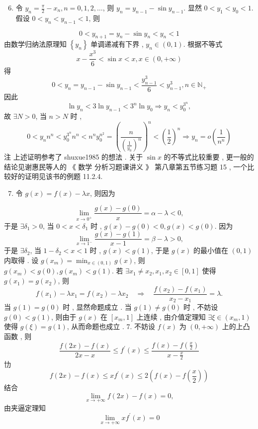 \documentclass[10pt]{article}
\begin{document}
\begin{enumerate}
  \setcounter{enumi}{5}
  \item  令  $y_{n}=\frac{\pi}{2}-x_{n}, n=0,1,2, \ldots$,  则  $y_{n}=y_{n-1}-\sin y_{n-1}$.  显然  $0<y_{1}<y_{0}<1$.  假设  $0<y_{n}<y_{n-1}<1$,  则 
\end{enumerate}
$$
0<y_{n+1}=y_{n}-\sin y_{n}<y_{n}<1
$$
 由数学归纳法原理知  $\left\{y_{n}\right\}$  单调递减有下界 , $y_{n} \in(0,1)$.  根据不等式 
$$
x-\frac{x^{3}}{6}<\sin x<x, x \in(0,+\infty)
$$
 得 
$$
0<y_{n}=y_{n-1}-\sin y_{n-1}<\frac{y_{n-1}^{3}}{6}<y_{n-1}^{3}, n \in \mathbb{N}_{+}
$$
 因此 
$$
\ln y_{n}<3 \ln y_{n-1}<3^{n} \ln y_{0} \Longrightarrow y_{n}<y_{0}^{3^{n}},
$$
 故  $\exists N>0$,  当  $n>N$  时 ,
$$
0<y_{n} n^{n}<y_{0}^{3^{n}} n^{n}<n^{n} y_{0}^{n^{2}}=\left(\frac{n}{\left(\frac{1}{y_{0}}\right)^{n}}\right)^{n}<\left(\frac{1}{2}\right)^{n} \Longrightarrow y_{n}=o\left(\frac{1}{n^{n}}\right)
$$
 注   上述证明参考了  shuxue1985  的想法 .  关于  $\sin x$  的不等式比较重要 ,  更一般的结论见谢惠民等人的 《 数学   分析习题课讲义 》 第八章第五节练习题  15 , 一个比较好的证明见该书的例题  11.2.4.

\begin{enumerate}
  \setcounter{enumi}{6}
  \item  令  $g(x)=f(x)-\lambda x$,  则因为 
\end{enumerate}
$$
\lim _{x \rightarrow 0^{+}} \frac{g(x)-g(0)}{x}=\alpha-\lambda<0,
$$
 于是  $\exists \delta_{1}>0$,  当  $0<x<\delta_{1}$  时 , $g(x)-g(0)<0, g(x)<g(0)$.  因为 
$$
\lim _{x \rightarrow 1^{-}} \frac{g(x)-g(1)}{x-1}=\beta-\lambda>0,
$$
 于是  $\exists \delta_{2}$,  当  $1-\delta_{2}<x<1$  时 , $g(x)<g(1)$,  于是  $g(x)$  的最小值在  $(0,1)$  内取得 .  设  $g\left(x_{m}\right)=\min _{x \in(0,1)} g(x)$,  则  $g\left(x_{m}\right)<g(0), g\left(x_{m}\right)<g(1)$.  若  $\exists x_{1} \neq x_{2}, x_{1}, x_{2} \in[0,1]$  使得  $g\left(x_{1}\right)=g\left(x_{2}\right)$,  则 
$$
f\left(x_{1}\right)-\lambda x_{1}=f\left(x_{2}\right)-\lambda x_{2} \quad \Longrightarrow \quad \frac{f\left(x_{2}\right)-f\left(x_{1}\right)}{x_{2}-x_{1}}=\lambda .
$$
 当  $g(1)=g(0)$  时 ,  显然命题成立 .  当  $g(1) \neq g(0)$  时 ,  不妨设  $g(0)<g(1)$,  则由于  $g(x)$  在  $\left[x_{m}, 1\right]$  上连续 ,  由介值定理知  $\exists \xi \in\left(x_{m}, 1\right)$  使得  $g(\xi)=g(1)$,  从而命题也成立 . 7.  不妨设  $f(x)$  为  $(0,+\infty)$  上的上凸函数 ,  则 
$$
\frac{f(2 x)-f(x)}{2 x-x} \leqslant f^{\prime}(x) \leqslant \frac{f(x)-f\left(\frac{x}{2}\right)}{x-\frac{x}{2}}
$$
 㔹 
$$
f(2 x)-f(x) \leqslant x f^{\prime}(x) \leqslant 2\left(f(x)-f\left(\frac{x}{2}\right)\right)
$$
 结合 
$$
\lim _{x \rightarrow+\infty} f(2 x)-f(x)=0,
$$
 由夹逼定理知 
$$
\lim _{x \rightarrow+\infty} x f^{\prime}(x)=0
$$
\end{document}
